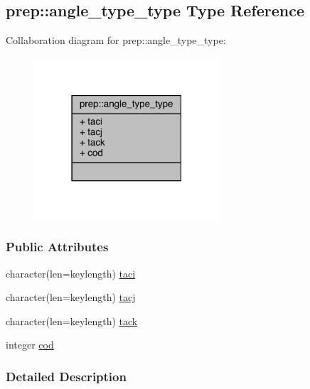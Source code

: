 \hypertarget{structprep_1_1angle__type__type}{\subsection{prep\-:\-:angle\-\_\-type\-\_\-type Type Reference}
\label{structprep_1_1angle__type__type}
}


Collaboration diagram for prep\-:\-:angle\-\_\-type\-\_\-type\-:
\nopagebreak
\begin{figure}[H]
\begin{center}
\leavevmode
\includegraphics[width=195pt]{structprep_1_1angle__type__type__coll__graph}
\end{center}
\end{figure}
\subsubsection*{Public Attributes}
\begin{DoxyCompactItemize}
\item 
character(len=keylength) \hyperlink{structprep_1_1angle__type__type_ac31a2b6fe772404151a3d6959862f5eb}{taci}
\item 
character(len=keylength) \hyperlink{structprep_1_1angle__type__type_ad388c67349e6ca0e9de1bb11d2b6c1c1}{tacj}
\item 
character(len=keylength) \hyperlink{structprep_1_1angle__type__type_acc5fb535d5018f01dead7ef4ced2e7da}{tack}
\item 
integer \hyperlink{structprep_1_1angle__type__type_a48ee5c7c8c1e2b8ba3a29702e252b46a}{cod}
\end{DoxyCompactItemize}


\subsubsection{Detailed Description}



